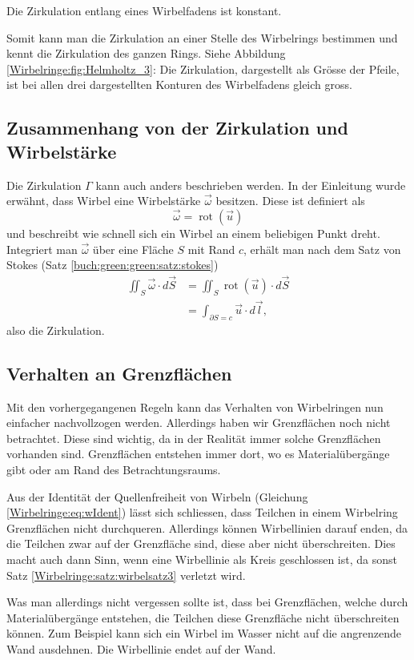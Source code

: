 \begin{satz}
    \label{Wirbelringe:satz:wirbelsatz3}
    Die Zirkulation entlang eines Wirbelfadens ist konstant. 
\end{satz}

Somit kann man die Zirkulation an einer Stelle des Wirbelrings bestimmen und kennt die Zirkulation des ganzen Rings.
Siehe Abbildung \ref{Wirbelringe:fig:Helmholtz_3}: 
Die Zirkulation, dargestellt als Grösse der Pfeile, ist bei allen drei dargestellten Konturen des Wirbelfadens gleich gross.

\subsection{Zusammenhang von der Zirkulation und Wirbelstärke\label{Wirbelringe:Stokes}}

Die Zirkulation \(\Gamma\) kann auch anders beschrieben werden. 
In der Einleitung wurde erwähnt, dass Wirbel eine Wirbelstärke \(\vec{\omega}\) besitzen.
Diese ist definiert als
\[
\vec{\omega}
=
\operatorname{rot}(\vec{u})
\]
und beschreibt wie schnell sich ein Wirbel an einem beliebigen Punkt dreht.
Integriert man \(\vec{\omega}\) über eine Fläche \(S\) mit Rand \(c\), erhält man nach dem Satz von Stokes (Satz \ref{buch:green:green:satz:stokes})
\begin{align*}
\iint_{S} \vec{\omega} \cdot d \vec{S}
&=
\iint_{S} \operatorname{rot}(\vec{u})\cdot  d \vec{S}\\
&=
\int_{\partial S = c} \vec{u} \cdot d\vec{l},
\end{align*}
also die Zirkulation.

\subsection{Verhalten an Grenzflächen\label{Wirbelringe:Grenzflaechen}}

Mit den vorhergegangenen Regeln kann das Verhalten von Wirbelringen nun einfacher nachvollzogen werden.
Allerdings haben wir Grenzflächen noch nicht betrachtet.
%
Diese sind wichtig, da in der Realität immer solche Grenzflächen vorhanden sind.
Grenzflächen entstehen immer dort, wo es Materialübergänge gibt oder am Rand des Betrachtungsraums.

Aus der Identität der Quellenfreiheit von Wirbeln (Gleichung \eqref{Wirbelringe:eq:wIdent}) lässt sich schliessen, dass Teilchen in einem Wirbelring Grenzflächen nicht durchqueren.
Allerdings können Wirbellinien darauf enden, da die Teilchen zwar auf der Grenzfläche sind, diese aber nicht überschreiten.
Dies macht auch dann Sinn, wenn eine Wirbellinie als Kreis geschlossen ist, da sonst Satz \ref{Wirbelringe:satz:wirbelsatz3} verletzt wird.

Was man allerdings nicht vergessen sollte ist, dass bei Grenzflächen, welche durch Materialübergänge entstehen, die Teilchen diese Grenzfläche nicht überschreiten können.
Zum Beispiel kann sich ein Wirbel im Wasser nicht auf die angrenzende Wand ausdehnen.
Die Wirbellinie endet auf der Wand.

